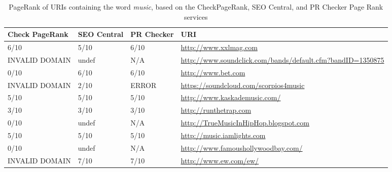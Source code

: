 \newpage
\begin{table}
\small
\begin{tabular}{ | p{2.0cm} | p{2.4cm} | p{2.0cm} | p{8.0cm} | }
\hline
\textbf{Check PageRank} & \textbf{SEO Central} & \textbf{PR Checker} & \textbf{URI} \\
\hline
6/10 & 5/10 & 6/10  & \url{http://www.xxlmag.com } \\
\hline
INVALID DOMAIN & undef & N/A & \url{ http://www.soundclick.com/bands/default.cfm?bandID=1350875} \\
\hline
0/10 & 6/10 & 6/10 & \url{ http://www.bet.com} \\
\hline
INVALID DOMAIN & 2/10 & ERROR & \url{ https://soundcloud.com/scorpios4music} \\
\hline 
5/10 & 5/10 & 5/10 & \url{ http://www.kaskademusic.com/} \\
\hline
3/10 & 3/10 & 3/10 & \url{http://runthetrap.com} \\
\hline
0/10 & undef & N/A & \url{ http://TrueMusicInHipHop.blogspot.com} \\
\hline
5/10 & 5/10 & 5/10 & \url{ http://music.iamlights.com} \\
\hline
0/10 & undef & N/A & \url{ http://www.famoushollywoodbay.com/} \\
\hline
INVALID DOMAIN & 7/10 & 7/10 &\url{ http://www.ew.com/ew/} \\
\hline
\end{tabular}
\caption{PageRank of URIs containing the word \emph{music}, based on the CheckPageRank, SEO Central, and PR Checker Page Rank services}
\label{table:q3-1}
\end{table}

